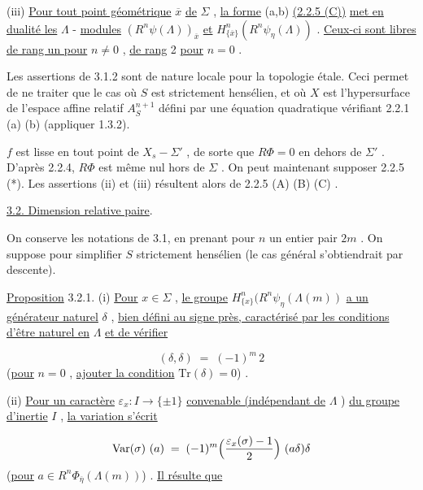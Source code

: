 (iii)  \underline{Pour tout point géométrique} $\overline{x}$ \underline{de} $\Sigma$ , \underline{la forme} (a,b) \underline{(2.2.5 (C))} \underline{met en dualité les} $\Lambda$ - \underline{modules} $(R^{n}\psi(\Lambda))_{\overline{x}}$ \underline{et} $H^{n}_{\{\overline{x}\}}(R^{n}\psi_{\eta}(\Lambda))$ . \underline{Ceux-ci sont libres de rang un pour} $n \neq 0$ , \underline{de rang} 2 \underline{pour} $n = 0$ .

Les assertions de 3.1.2 sont de nature locale pour la topologie étale. Ceci permet de ne traiter que le cas où $S$ est strictement hensélien, et où $X$ est l'hypersurface de l'espace affine relatif $A^{n+1}_{S}$ défini par une équation quadratique vérifiant 2.2.1 (a) (b) (appliquer 1.3.2).

$f$ est lisse en tout point de $X_{s} - \Sigma'$ , de sorte que $R\Phi = 0$ en dehors de $\Sigma'$ . D'après 2.2.4, $R\Phi$ est même nul hors de $\Sigma$ . On peut maintenant supposer 2.2.5 (*). Les assertions (ii) et (iii) résultent alors de 2.2.5 (A) (B) (C) .


\underline{3.2. Dimension relative paire}.

On conserve les notations de 3.1, en prenant pour $n$ un entier pair $2m$ . On suppose pour simplifier $S$ strictement hensélien (le cas général s'obtiendrait par descente).

\underline{Proposition} 3.2.1.  (i) \underline{Pour} $x \in \Sigma$ , \underline{le groupe} $H^{n}_{\{x\}}(R^{n}\psi_{\eta}(\Lambda(m))$ \underline{a un générateur naturel} $\delta$ , \underline{bien défini au signe près, caractérisé par les conditions d'être naturel en} $\Lambda$ \underline{et de vérifier} 



\begin{equation*}
 (\delta,\delta) \;=\; (-1)^{m}\, 2
\end{equation*}
(\underline{pour} $n = 0$ , \underline{ajouter la condition} $\mathrm{Tr}(\delta) = 0$) .

(ii)  \underline{Pour un caractère} $\varepsilon_{x} : I \longrightarrow \{\pm 1\}$ \underline{convenable (indépendant de} $\Lambda$ ) \underline{du groupe d'inertie} $I$ , \underline{la variation s'écrit}

\begin{equation*}
\mathrm{Var}(\sigma)\ (a) \;=\; (-1)^{m}\Bigl(\frac{\varepsilon_{x}(\sigma)-1}{2}\Bigr)\ (a\delta)\delta
\end{equation*}
(\underline{pour} $a \in R^{n}\Phi_{\overline{\eta}}(\Lambda(m))$) . \underline{Il résulte que}

